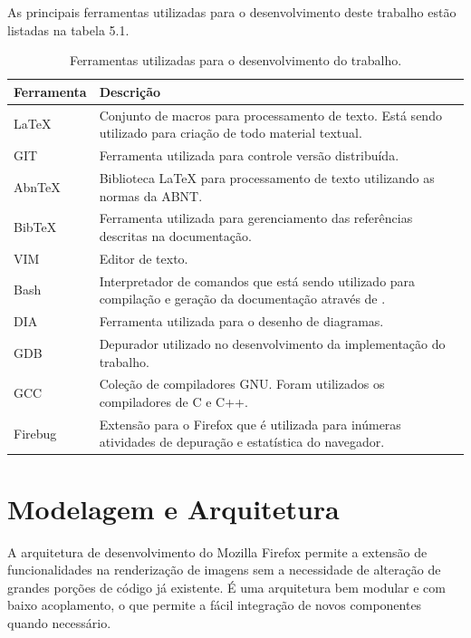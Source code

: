 \documentclass[espaco=simples,appendix=Name]{abnt}
\begin{document}
As principais ferramentas utilizadas para o desenvolvimento deste trabalho estão listadas na tabela 5.1.

\begin{table}[ht]
	\centering
	\caption{Ferramentas utilizadas para o desenvolvimento do trabalho.
	\label{tbl:padc}}{
		\vspace{0.3cm}
		\begin{tabular}{|l|p{14cm}|}
	    	\hline
			\textbf{Ferramenta} & \textbf{Descrição} \\
			\hline
			LaTeX		& Conjunto de macros para processamento de texto. Está sendo utilizado para criação de todo material textual. \\
			\hline
			GIT		& Ferramenta utilizada para controle versão distribuída. \\
			\hline
			AbnTeX		& Biblioteca LaTeX para processamento de texto utilizando as normas da ABNT. \\
			\hline
			BibTeX		& Ferramenta utilizada para gerenciamento das referências descritas na documentação. \\
			\hline
			VIM		& Editor de texto. \\
			\hline
			Bash		& Interpretador de comandos que está sendo utilizado para compilação e geração da documentação através de \ingles{scripts}. \\
			\hline
			DIA		& Ferramenta utilizada para o desenho de diagramas. \\
			\hline
			GDB		& Depurador utilizado no desenvolvimento da implementação do trabalho. \\
			\hline
			GCC		& Coleção de compiladores GNU. Foram utilizados os compiladores de C e C++. \\
			\hline
			Firebug		& Extensão para o Firefox que é utilizada para inúmeras atividades de depuração e estatística do navegador. \\
			\hline
		\end{tabular}
		}
\end{table}

\section{Modelagem e Arquitetura}

A arquitetura de desenvolvimento do Mozilla Firefox permite a extensão de funcionalidades na renderização de imagens sem a necessidade de alteração de grandes porções de código já existente. É uma arquitetura bem modular e com baixo acoplamento, o que permite a fácil integração de novos componentes quando necessário. 
\end{document}
